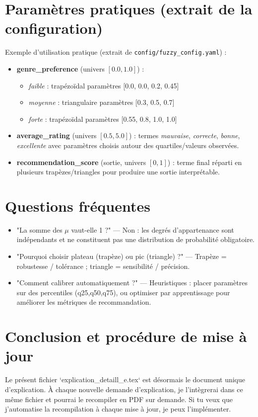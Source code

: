 \documentclass[a4paper,11pt]{article}
\begin{document}
\section{Paramètres pratiques (extrait de la configuration)}
Exemple d'utilisation pratique (extrait de \texttt{config/fuzzy_config.yaml}) :
\begin{itemize}
    \item \textbf{genre\_preference} (univers $[0.0,1.0]$) :
        \begin{itemize}
            \item \emph{faible} : trapézoïdal paramètres [0.0, 0.0, 0.2, 0.45]
            \item \emph{moyenne} : triangulaire paramètres [0.3, 0.5, 0.7]
            \item \emph{forte} : trapézoïdal paramètres [0.55, 0.8, 1.0, 1.0]
        \end{itemize}
    \item \textbf{average\_rating} (univers $[0.5,5.0]$) : termes \emph{mauvaise}, \emph{correcte}, \emph{bonne}, \emph{excellente} avec paramètres choisis autour des quartiles/valeurs observées.
    \item \textbf{recommendation\_score} (sortie, univers $[0,1]$) : terme final réparti en plusieurs trapèzes/triangles pour produire une sortie interprétable.
\end{itemize}

\section{Questions fréquentes}
\begin{itemize}
    \item "La somme des $\mu$ vaut-elle 1 ?" — Non : les degrés d'appartenance sont indépendants et ne constituent pas une distribution de probabilité obligatoire.
    \item "Pourquoi choisir plateau (trapèze) ou pic (triangle) ?" — Trapèze = robustesse / tolérance ; triangle = sensibilité / précision.
    \item "Comment calibrer automatiquement ?" — Heuristiques : placer paramètres sur des percentiles (q25,q50,q75), ou optimiser par apprentissage pour améliorer les métriques de recommandation.
\end{itemize}

\section*{Conclusion et procédure de mise à jour}
Le présent fichier `explication\_detaill\_e.tex` est désormais le document unique d'explication. À chaque nouvelle demande d'explication, je l'intègrerai dans ce même fichier et pourrai le recompiler en PDF sur demande. Si tu veux que j'automatise la recompilation à chaque mise à jour, je peux l'implémenter.
\end{document}
